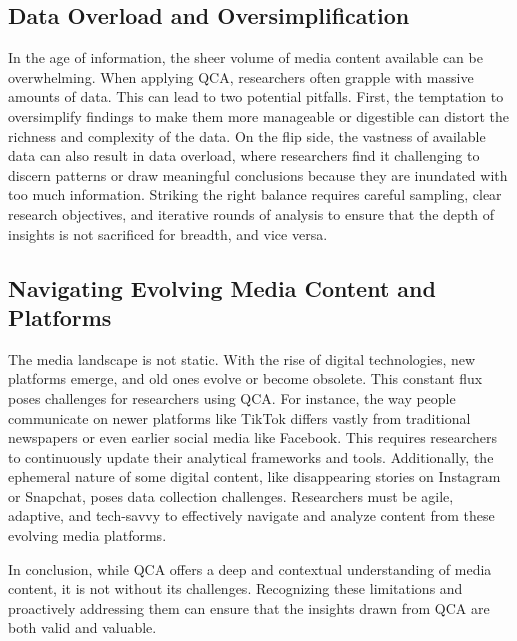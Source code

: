 \documentclass[
  b5paper]{book}
\begin{document}
\hypertarget{data-overload-and-oversimplification}{%
\subsection*{Data Overload and Oversimplification}\label{data-overload-and-oversimplification}}

In the age of information, the sheer volume of media content available can be overwhelming. When applying QCA, researchers often grapple with massive amounts of data. This can lead to two potential pitfalls. First, the temptation to oversimplify findings to make them more manageable or digestible can distort the richness and complexity of the data. On the flip side, the vastness of available data can also result in data overload, where researchers find it challenging to discern patterns or draw meaningful conclusions because they are inundated with too much information. Striking the right balance requires careful sampling, clear research objectives, and iterative rounds of analysis to ensure that the depth of insights is not sacrificed for breadth, and vice versa.

\hypertarget{navigating-evolving-media-content-and-platforms}{%
\subsection*{Navigating Evolving Media Content and Platforms}\label{navigating-evolving-media-content-and-platforms}}

The media landscape is not static. With the rise of digital technologies, new platforms emerge, and old ones evolve or become obsolete. This constant flux poses challenges for researchers using QCA. For instance, the way people communicate on newer platforms like TikTok differs vastly from traditional newspapers or even earlier social media like Facebook. This requires researchers to continuously update their analytical frameworks and tools. Additionally, the ephemeral nature of some digital content, like disappearing stories on Instagram or Snapchat, poses data collection challenges. Researchers must be agile, adaptive, and tech-savvy to effectively navigate and analyze content from these evolving media platforms.

In conclusion, while QCA offers a deep and contextual understanding of media content, it is not without its challenges. Recognizing these limitations and proactively addressing them can ensure that the insights drawn from QCA are both valid and valuable.
\end{document}
